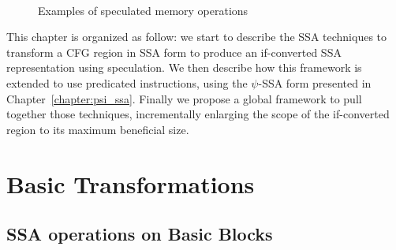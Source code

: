 \begin{figure}[h]
\hfill
{}\\
\hfill
{}
\caption{Examples of speculated memory operations}
\label{fig:spec}
\end{figure}




This chapter is organized as follow: we start to describe the SSA techniques to transform a CFG region in SSA form to produce an if-converted SSA representation using speculation. We then describe how this framework is extended to use predicated instructions, using the $\psi$-SSA form presented in Chapter~\ref{chapter:psi_ssa}. Finally we propose a global framework to pull together those techniques, incrementally enlarging the scope of the if-converted region to its maximum beneficial size.

\section{Basic Transformations}
\label{sec:basic}

\subsection{SSA operations on Basic Blocks}


